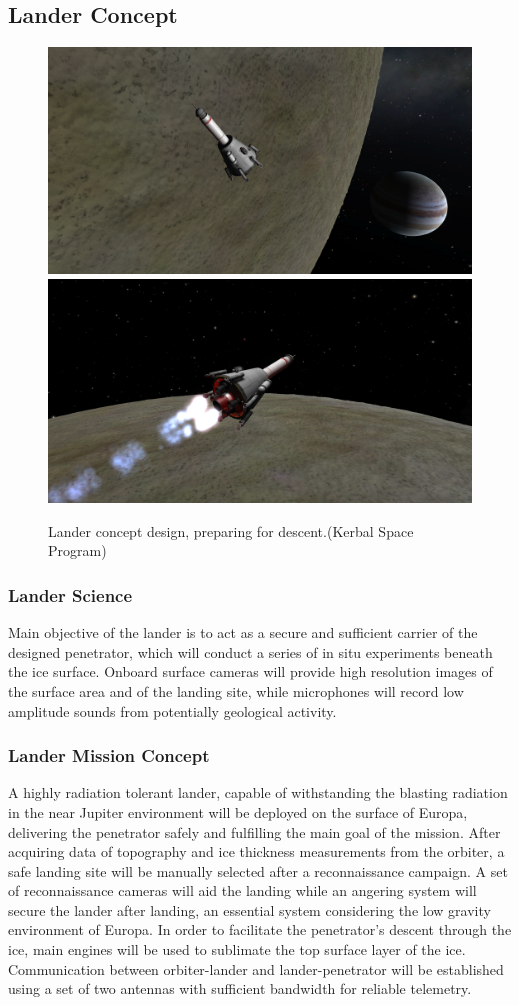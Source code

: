 \subsection{Lander Concept}

\begin{figure}[htb!]
    \centering
    \captionsetup[subfigure]{width=0.45\textwidth}
    {
        \includegraphics[width=.48\textwidth]{figures/Orbiter/2.PNG}
        \label{fig:ice_spectra_contamination}
    }
    {
        \includegraphics[width=.48\textwidth]{figures/Orbiter/4.PNG}
        \label{fig:ice_spectra_feature}
    }
    \caption{Lander concept design, preparing for descent.(Kerbal Space Program)}
\end{figure}

\subsubsection{Lander Science}

Main objective of the lander is to act as a secure and sufficient carrier of the designed penetrator, which will conduct a series of in situ experiments beneath the ice surface. Onboard surface cameras will provide high resolution images of the surface area and of the landing site, while microphones will record low amplitude sounds from potentially geological activity.

\subsubsection{Lander Mission Concept}
A highly radiation tolerant lander, capable of withstanding the blasting radiation in the near Jupiter environment will be deployed on the surface of Europa, delivering the penetrator safely and fulfilling the main goal of the mission. 
After acquiring data of topography and ice thickness measurements from the orbiter, a safe landing site will be manually selected after a reconnaissance campaign. A set of reconnaissance cameras will aid the landing while an angering system will secure the lander after landing, an essential system considering the low gravity environment of Europa. In order to facilitate the penetrator’s descent through the ice, main engines will be used to sublimate the top surface layer of the ice. Communication between orbiter-lander and lander-penetrator will be established using a set of two antennas with sufficient bandwidth for reliable telemetry.


